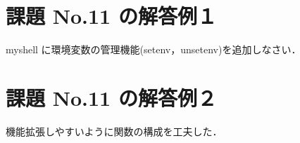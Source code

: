 \documentclass[a4j,twcolumn,11pt,nomag]{ltjarticle}      %
\begin{document}
\onecolumn

\section*{課題 No.11 の解答例１}
myshell に環境変数の管理機能(setenv，unsetenv)を追加しなさい．

\section*{課題 No.11 の解答例２}
機能拡張しやすいように関数の構成を工夫した．
\end{document}
